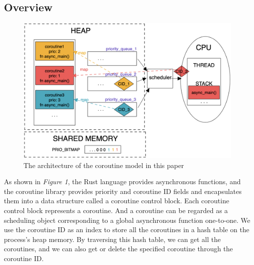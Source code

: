 \documentclass[10pt]{article}
\begin{document}
\subsection{Overview}

\begin{figure}[ht]
\begin{center}
\includegraphics[width=\columnwidth]{SDSS2021-LaTEX/overview.png}
\caption{The architecture of the coroutine model in this paper}
\label{overview}
\end{center}
\end{figure}

As shown in \textit{Figure 1}, the Rust language provides asynchronous functions, and the coroutine library provides priority and coroutine ID fields and encapsulates them into a data structure called a coroutine control block. Each coroutine control block represents a coroutine. And a coroutine can be regarded as a scheduling object corresponding to a global asynchronous function one-to-one. We use the coroutine ID as an index to store all the coroutines in a hash table on the process's heap memory. By traversing this hash table, we can get all the coroutines, and we can also get or delete the specified coroutine through the coroutine ID. 
\end{document}
